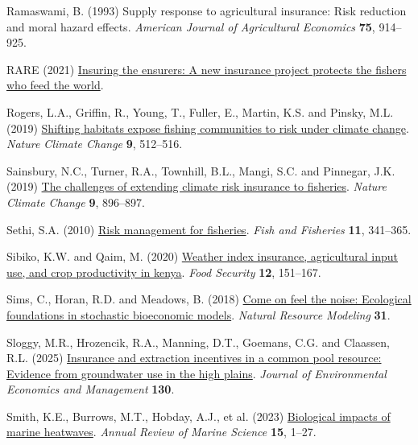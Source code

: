 \documentclass[
  letterpaper,
  DIV=11,
  numbers=noendperiod]{scrartcl}
\newlength{\cslhangindent}
\newenvironment{CSLReferences}[2] %
 {\begin{list}{}{%
  \setlength{\itemindent}{0pt}
  \setlength{\leftmargin}{0pt}
  \setlength{\parsep}{0pt}
  \ifodd #1
   \setlength{\leftmargin}{\cslhangindent}
   \setlength{\itemindent}{-1\cslhangindent}
  \fi
  \setlength{\itemsep}{#2\baselineskip}}}
 {\end{list}}
\theoremstyle{plain}
\theoremstyle{plain}
\theoremstyle{remark}
\begin{document}
\begin{CSLReferences}{1}{0}
Ramaswami, B. (1993) Supply response to agricultural insurance: Risk
reduction and moral hazard effects. \emph{American Journal of
Agricultural Economics} \textbf{75}, 914--925.

RARE (2021)
\href{https://rare.org/stories-articles/insuring-the-ensurers-rares-fish-forever-program-protects-the-fishers-who-feed-the-world/}{Insuring
the ensurers: A new insurance project protects the fishers who feed the
world}.

Rogers, L.A., Griffin, R., Young, T., Fuller, E., Martin, K.S. and
Pinsky, M.L. (2019)
\href{https://doi.org/10.1038/s41558-019-0503-z}{Shifting habitats
expose fishing communities to risk under climate change}. \emph{Nature
Climate Change} \textbf{9}, 512--516.

Sainsbury, N.C., Turner, R.A., Townhill, B.L., Mangi, S.C. and Pinnegar,
J.K. (2019) \href{https://doi.org/10.1038/s41558-019-0645-z}{The
challenges of extending climate risk insurance to fisheries}.
\emph{Nature Climate Change} \textbf{9}, 896--897.

Sethi, S.A. (2010)
\href{https://doi.org/10.1111/j.1467-2979.2010.00363.x}{Risk management
for fisheries}. \emph{Fish and Fisheries} \textbf{11}, 341--365.

Sibiko, K.W. and Qaim, M. (2020)
\href{https://doi.org/10.1007/s12571-019-00987-y}{Weather index
insurance, agricultural input use, and crop productivity in kenya}.
\emph{Food Security} \textbf{12}, 151--167.

Sims, C., Horan, R.D. and Meadows, B. (2018)
\href{https://doi.org/10.1111/NRM.12191}{Come on feel the noise:
Ecological foundations in stochastic bioeconomic models}. \emph{Natural
Resource Modeling} \textbf{31}.

Sloggy, M.R., Hrozencik, R.A., Manning, D.T., Goemans, C.G. and
Claassen, R.L. (2025)
\href{https://doi.org/10.1016/j.jeem.2025.103125}{Insurance and
extraction incentives in a common pool resource: Evidence from
groundwater use in the high plains}. \emph{Journal of Environmental
Economics and Management} \textbf{130}.

Smith, K.E., Burrows, M.T., Hobday, A.J., et al. (2023)
\href{https://doi.org/10.1146/annurev-marine-032122-121437}{Biological
impacts of marine heatwaves}. \emph{Annual Review of Marine Science}
\textbf{15}, 1--27.


\end{CSLReferences}
\end{document}

